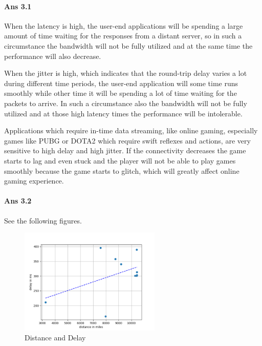 \documentclass[paper=a4, fontsize=10pt]{scrartcl} %
\numberwithin{equation}{section} %
\numberwithin{figure}{section} %
\numberwithin{table}{section} %
\begin{document}
\paragraph{Ans 3.1} When the latency is high, the user-end applications will be spending a large amount of time waiting for the responses from a distant server, so in such a circumstance the bandwidth will not be fully utilized and at the same time the performance will also decrease.

When the jitter is high, which indicates that the round-trip delay varies a lot during different time periods, the user-end application will some time runs smoothly while other time it will be spending a lot of time waiting for the packets to arrive. In such a circumstance also the bandwidth will not be fully utilized and at those high latency times the performance will be intolerable. 

Applications which require in-time data streaming, like online gaming, especially games like PUBG or DOTA2 which require swift reflexes and actions, are very sensitive to high delay and high jitter. If the connectivity decreases the game starts to lag and even stuck and the player will not be able to play games smoothly because the game starts to glitch, which will greatly affect online gaming experience.

\paragraph{Ans 3.2}
See the following figures.
\begin{figure}[htbp!]
    \centering
    \includegraphics[width=0.6\textwidth]{dist_delay_fit.png}
    \caption{Distance and Delay}%
    \vspace{-1em}
\end{figure}
\end{document}
